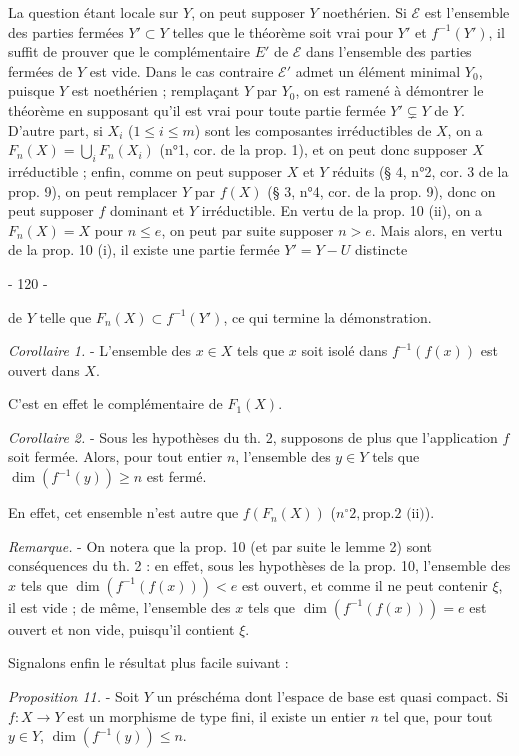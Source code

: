 La question étant locale sur $Y$, on peut supposer $Y$ noethérien. Si $\mathcal{E}$ est l'ensemble des parties fermées $Y' \subset Y$ telles que le théorème soit vrai pour $Y'$ et $f^{-1}(Y')$, il suffit de prouver que le complémentaire $E'$ de $\mathcal{E}$ dans l'ensemble des parties fermées de $Y$ est vide. Dans le cas contraire $\mathcal{E}'$ admet un élément minimal $Y_0$, puisque $Y$ est noethérien ; remplaçant $Y$ par $Y_0$, on est ramené à démontrer le théorème en supposant qu'il est vrai pour toute partie fermée $Y' \subsetneq Y$ de $Y$. D'autre part, si $X_i$ ($1 \le i \le m$) sont les composantes irréductibles de $X$, on a $F_n(X) = \bigcup_i F_n(X_i)$ (n°1, cor. de la prop. 1), et on peut donc supposer $X$ irréductible ; enfin, comme on peut supposer $X$ et $Y$ réduits (§ 4, n°2, cor. 3 de la prop. 9), on peut remplacer $Y$ par $f(X)$ (§ 3, n°4, cor. de la prop. 9), donc on peut supposer $f$ dominant et $Y$ irréductible. En vertu de la prop. 10 (ii), on a $F_n(X) = X$ pour $n \le e$, on peut par suite supposer $n > e$. Mais alors, en vertu de la prop. 10 (i), il existe une partie fermée $Y' = Y - U$ distincte

\newpage


- 120 -

de $Y$ telle que $F_n(X) \subset f^{-1}(Y')$, ce qui termine la démonstration.

\emph{Corollaire 1.} - L'ensemble des $x \in X$ tels que $x$ soit isolé dans $f^{-1}(f(x))$ est ouvert dans $X$.

C'est en effet le complémentaire de $F_1(X)$.

\emph{Corollaire 2.} - Sous les hypothèses du th. 2, supposons de plus que l'application $f$ soit fermée. Alors, pour tout entier $n$, l'ensemble des $y \in Y$ tels que $\dim(f^{-1}(y)) \geq n$ est fermé.

En effet, cet ensemble n'est autre que $f(F_n(X))$ ($n^\circ 2, \text{prop.} 2 \text{ (ii)}$).

\emph{Remarque.} - On notera que la prop. 10 (et par suite le lemme 2) sont conséquences du th. 2 : en effet, sous les hypothèses de la prop. 10, l'ensemble des $x$ tels que $\dim(f^{-1}(f(x))) < e$ est ouvert, et comme il ne peut contenir $\xi$, il est vide ; de même, l'ensemble des $x$ tels que $\dim(f^{-1}(f(x))) = e$ est ouvert et non vide, puisqu'il contient $\xi$.

Signalons enfin le résultat plus facile suivant :

\emph{Proposition 11.} - Soit $Y$ un préschéma dont l'espace de base est quasi compact. Si $f: X \to Y$ est un morphisme de type fini, il existe un entier $n$ tel que, pour tout $y \in Y$, $\dim(f^{-1}(y)) \leq n$.

